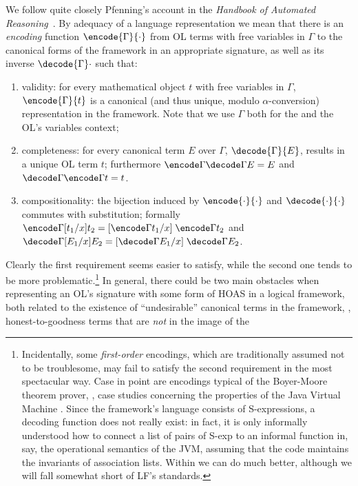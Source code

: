 \documentclass[final]{svjour3}
\begin{document}
We follow quite closely Pfenning's account in the \textit{Handbook of
Automated Reasoning}~\cite{Pfenning99handbook}.  By adequacy of a
language representation we mean 
 that there is an \emph{encoding} function $\encode{\Gamma}
{\cdot}$ from OL terms with free variables in $\Gamma$
to the canonical forms of the framework in an appropriate signature, as
well as its inverse $\decode{\Gamma} \cdot$ such that:
\begin{enumerate}
\item validity: for every mathematical object $t$ with free variables
  in $\Gamma$, $\encode{\Gamma}{t}$ is a canonical (and thus
  unique, modulo $\alpha$-conversion) representation in the
  framework. Note that we use $\Gamma$ both for the \hybrid and the
  OL's variables context;
\item completeness: for every canonical term $E$ over   $\Gamma$,
  $\decode{\Gamma}{E}$, results in a unique OL term $t$; furthermore
  $\encode\Gamma{\decode \Gamma E} = E$ and
  $\decode\Gamma{\encode \Gamma t} = t$.
\item compositionality: the bijection induced by
  $\encode{\cdot}{\cdot}$ and $\decode{\cdot}{\cdot}$ commutes with
  substitution; formally $\encode \Gamma {[t_1/x] {t_2}} = {[\encode
    \Gamma {t_1}/x]} \; \encode \Gamma {t_2}$ and $\decode \Gamma
  {[E_1/x] {E_2}} = {[\decode \Gamma {E_1}/x]} \; \decode \Gamma
  {E_2}$.
\end{enumerate}
Clearly the first requirement seems easier to satisfy, while the
second one tends to be more problematic.\footnote{Incidentally, some
  \emph{first-order} encodings, which are traditionally assumed not to
  be troublesome, may fail to satisfy the second requirement in the
  most spectacular way. Case in point are encodings typical of the
  Boyer-Moore theorem prover, \eg, case studies
  concerning the properties of the Java Virtual Machine
  \cite{acl2java}.  Since the framework's language consists of
  S-expressions, a decoding function does not really exist: in fact,
  it is only informally understood how to connect a list of pairs of
  S-exp to an informal function in, say, the operational semantics of
  the JVM, assuming that the code maintains the invariants of
  association lists.  Within \hybrid we can do much better, although
  we will fall somewhat short of LF's standards.}  In general, there
could be two main obstacles when representing an OL's signature with
some form of HOAS in a logical framework, both related to the
existence of ``undesirable'' canonical terms in the framework, \ie,
honest-to-goodness terms that are \emph{not} in the image of the
\end{document}
